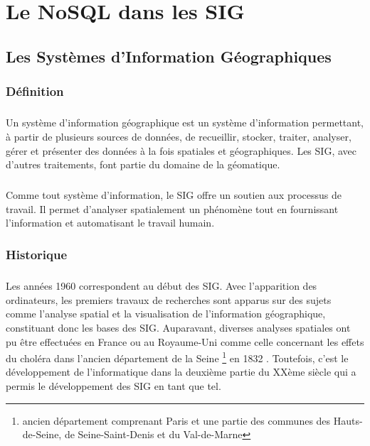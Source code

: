 \chapter{Le NoSQL dans les SIG}

\section{Les Systèmes d’Information Géographiques}
\subsection{Définition}
\paragraph{}Un système d'information géographique est un système d’information permettant, à partir de plusieurs sources de données, de recueillir, stocker, traiter, analyser, gérer et présenter des données à la fois spatiales et géographiques. Les \acrshort{SIG}, avec d’autres traitements, font partie du domaine de la géomatique. 

\paragraph{}Comme tout système d’information, le \acrshort{SIG} offre un soutien aux processus de travail. Il permet d'analyser spatialement un phénomène tout en fournissant l'information et automatisant le travail humain.

\subsection{Historique}
\paragraph{}Les années 1960 correspondent au début des \acrfull{SIG}. Avec l’apparition des ordinateurs, les premiers travaux de recherches sont apparus sur des sujets comme l’analyse spatial et la visualisation de l’information géographique, constituant donc les bases des \acrshort{SIG}. Auparavant, diverses analyses spatiales ont pu être effectuées en France ou au Royaume-Uni comme celle concernant les effets du choléra dans l’ancien département de la Seine \footnote{ancien département comprenant Paris et une partie des communes des Hauts-de-Seine, de Seine-Saint-Denis et du Val-de-Marne} en 1832 \supercite{rapportCholeraSeine}. Toutefois, c’est le développement de l’informatique dans la deuxième partie du XXème siècle qui a permis le développement des \acrshort{SIG} en tant que tel.
